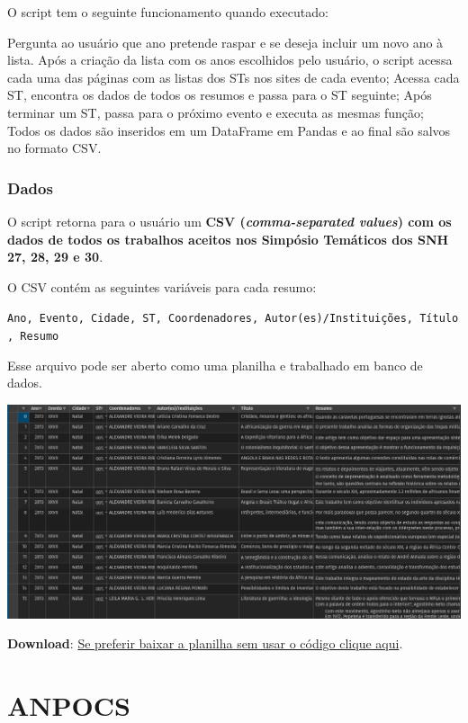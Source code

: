 \documentclass[
]{book}
\begin{document}
O script tem o seguinte funcionamento quando executado:

Pergunta ao usuário que ano pretende raspar e se deseja incluir um novo ano à lista.
Após a criação da lista com os anos escolhidos pelo usuário, o script acessa cada uma das páginas com as listas dos STs nos sites de cada evento;
Acessa cada ST, encontra os dados de todos os resumos e passa para o ST seguinte;
Após terminar um ST, passa para o próximo evento e executa as mesmas função;
Todos os dados são inseridos em um DataFrame em Pandas e ao final são salvos no formato CSV.

\hypertarget{dados-1}{%
\subsection{Dados}\label{dados-1}}

O script retorna para o usuário um \textbf{CSV (\emph{comma-separated values}) com os dados de todos os trabalhos aceitos nos Simpósio Temáticos dos SNH 27, 28, 29 e 30}.

O CSV contém as seguintes variáveis para cada resumo:

\texttt{Ano,\ Evento,\ Cidade,\ ST,\ Coordenadores,\ Autor(es)/Instituições,\ Título,\ Resumo}

Esse arquivo pode ser aberto como uma planilha e trabalhado em banco de dados.

\includegraphics{img/ex_csv2.png}

\textbf{Download}: \href{https://drive.google.com/file/d/12QCIsvFGIhveD84HUKwsLG-RbtpKBNsh/view?usp=sharing}{Se preferir baixar a planilha sem usar o código clique aqui}.

\hypertarget{anpocs}{%
\chapter{ANPOCS}\label{anpocs}}
\end{document}
